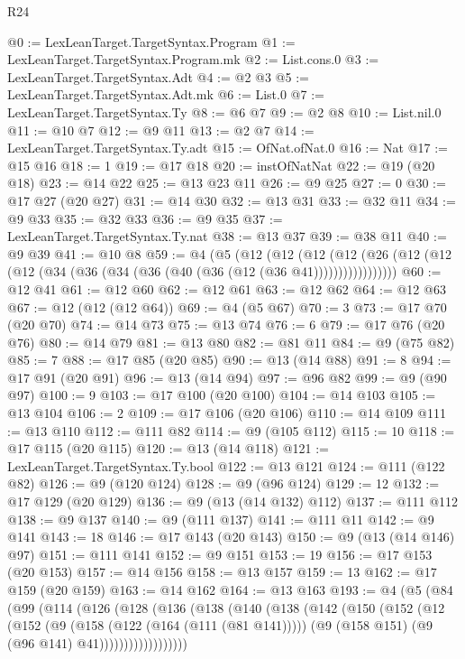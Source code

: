 \begin{lexlean}{R24}
\begin{coremodule}
@0 := LexLeanTarget.TargetSyntax.Program
@1 := LexLeanTarget.TargetSyntax.Program.mk
@2 := List.cons.{0}
@3 := LexLeanTarget.TargetSyntax.Adt
@4 := @2 @3
@5 := LexLeanTarget.TargetSyntax.Adt.mk
@6 := List.{0}
@7 := LexLeanTarget.TargetSyntax.Ty
@8 := @6 @7
@9 := @2 @8
@10 := List.nil.{0}
@11 := @10 @7
@12 := @9 @11
@13 := @2 @7
@14 := LexLeanTarget.TargetSyntax.Ty.adt
@15 := OfNat.ofNat.{0}
@16 := Nat
@17 := @15 @16
@18 := 1
@19 := @17 @18
@20 := instOfNatNat
@22 := @19 (@20 @18)
@23 := @14 @22
@25 := @13 @23 @11
@26 := @9 @25
@27 := 0
@30 := @17 @27 (@20 @27)
@31 := @14 @30
@32 := @13 @31
@33 := @32 @11
@34 := @9 @33
@35 := @32 @33
@36 := @9 @35
@37 := LexLeanTarget.TargetSyntax.Ty.nat
@38 := @13 @37
@39 := @38 @11
@40 := @9 @39
@41 := @10 @8
@59 := @4
    (@5
      (@12
        (@12
          (@12 (@12 (@26 (@12 (@12 (@12 (@34 (@36 (@34 (@36 (@40 (@36 (@12 (@36 @41)))))))))))))))))
@60 := @12 @41
@61 := @12 @60
@62 := @12 @61
@63 := @12 @62
@64 := @12 @63
@67 := @12 (@12 (@12 @64))
@69 := @4 (@5 @67)
@70 := 3
@73 := @17 @70 (@20 @70)
@74 := @14 @73
@75 := @13 @74
@76 := 6
@79 := @17 @76 (@20 @76)
@80 := @14 @79
@81 := @13 @80
@82 := @81 @11
@84 := @9 (@75 @82)
@85 := 7
@88 := @17 @85 (@20 @85)
@90 := @13 (@14 @88)
@91 := 8
@94 := @17 @91 (@20 @91)
@96 := @13 (@14 @94)
@97 := @96 @82
@99 := @9 (@90 @97)
@100 := 9
@103 := @17 @100 (@20 @100)
@104 := @14 @103
@105 := @13 @104
@106 := 2
@109 := @17 @106 (@20 @106)
@110 := @14 @109
@111 := @13 @110
@112 := @111 @82
@114 := @9 (@105 @112)
@115 := 10
@118 := @17 @115 (@20 @115)
@120 := @13 (@14 @118)
@121 := LexLeanTarget.TargetSyntax.Ty.bool
@122 := @13 @121
@124 := @111 (@122 @82)
@126 := @9 (@120 @124)
@128 := @9 (@96 @124)
@129 := 12
@132 := @17 @129 (@20 @129)
@136 := @9 (@13 (@14 @132) @112)
@137 := @111 @112
@138 := @9 @137
@140 := @9 (@111 @137)
@141 := @111 @11
@142 := @9 @141
@143 := 18
@146 := @17 @143 (@20 @143)
@150 := @9 (@13 (@14 @146) @97)
@151 := @111 @141
@152 := @9 @151
@153 := 19
@156 := @17 @153 (@20 @153)
@157 := @14 @156
@158 := @13 @157
@159 := 13
@162 := @17 @159 (@20 @159)
@163 := @14 @162
@164 := @13 @163
@193 := @4
    (@5
      (@84
        (@99
          (@114
            (@126
              (@128
                (@136
                  (@138
                    (@140
                      (@138
                        (@142
                          (@150
                            (@152
                              (@12
                                (@152
                                  (@9
                                    (@158 (@122 (@164 (@111 (@81 @141)))))
                                    (@9 (@158 @151) (@9 (@96 @141) @41))))))))))))))))))

\end{coremodule}
\end{lexlean}
